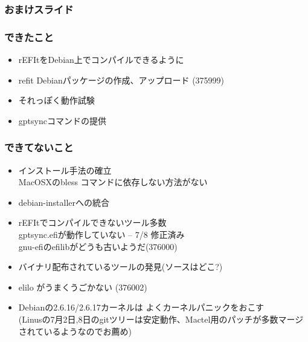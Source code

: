 \documentclass[cjk,dvipdfmx]{beamer}
\begin{document}
%
%
%
%

\begin{frame}
\frametitle{おまけスライド}
\end{frame}

\begin{frame}
\frametitle{できたこと}
\begin{itemize}
 \item rEFItをDebian上でコンパイルできるように
 \item refit Debianパッケージの作成、アップロード (375999)
 \item それっぽく動作試験
 \item gptsyncコマンドの提供
\end{itemize}
\end{frame}

\begin{frame}
\frametitle{できてないこと}
\begin{itemize}
 \item インストール手法の確立\\
       MacOSXのbless コマンドに依存しない方法がない
 \item debian-installerへの統合
 \item rEFItでコンパイルできないツール多数\\
       gptsync.efiが動作していない -- 7/8 修正済み\\
       gnu-efiのefilibがどうも古いようだ(376000)
 \item バイナリ配布されているツールの発見(ソースはどこ?)
 \item elilo がうまくうごかない (376002)
 \item Debianの2.6.16/2.6.17カーネルは
       よくカーネルパニックをおこす\\
       (Linusの7月2日,8日のgitツリーは安定動作、Mactel用のパッチが多数マージ
       されているようなのでお薦め)
\end{itemize}
\end{frame}
\end{document}
